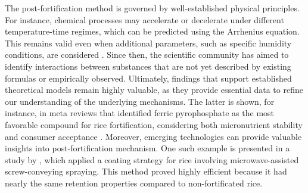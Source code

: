 \noindent 
The post-fortification method is governed by well-established physical principles. For instance, chemical processes may accelerate or decelerate under different temperature-time regimes, which can be predicted using the Arrhenius equation. This remains valid even when additional parameters, such as specific humidity conditions, are considered \autocite{arrhenius}. Since then, the scientific community has aimed to identify interactions between substances that are not yet described by existing formulas or empirically observed. Ultimately, findings that support established theoretical models remain highly valuable, as they provide essential data to refine our understanding of the underlying mechanisms.
The latter is shown, for instance, in meta reviews that identified ferric pyrophosphate as the most favorable compound for rice fortification, considering both micronutrient stability and consumer acceptance \autocite{10rice}. Moreover, emerging technologies can provide valuable insights into post-fortification mechanism. One such example is presented in a study by \citet{kumari}, which applied a coating strategy for rice involving microwave-assisted screw-conveying spraying. This method proved highly efficient because it had nearly the same retention properties compared to non-fortificated rice. 
